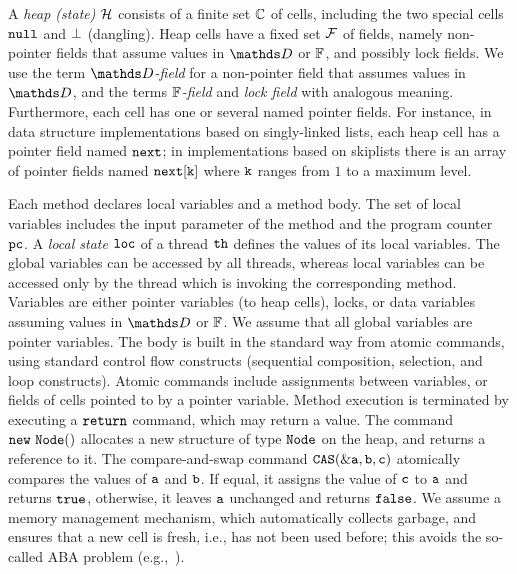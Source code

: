 A {\it heap (state)} ${\mathcal H}$ consists of a finite set
${\mathbb C}$ of cells, including the two special cells
${\tt null}$ and $\bot$ (dangling).
Heap cells have a fixed set $\mathcal{F}$ of fields, namely
non-pointer fields that assume values in
$\ddomain$ or $\mathbb{F}$, and possibly lock fields.
We use the term {\em $\ddomain$-field} for a non-pointer field that
assumes values in $\ddomain$, and the terms {\em $\mathbb{F}$-field} and {\em lock field}
with analogous meaning.
Furthermore, each cell has one or several named pointer fields.
For instance, in data structure implementations based on singly-linked lists,
each heap cell has a pointer field named $\tt next$; in implementations
based on skiplists there is an array of pointer fields named
$\tt next[k]$ where $\tt k$ ranges from $1$ to a maximum level.

%
Each method declares local variables and a method body.
%
The set of local variables includes the input parameter of the method and
the program counter $\tt pc$.
A {\it local state} ${\tt loc}$ of a thread ${\tt th}$
defines  the values of its local variables.
The global variables can be
accessed by all threads, whereas local variables can be accessed only
by the thread which is invoking the corresponding method.
Variables are either pointer variables (to heap cells), locks, or data variables assuming values in $\ddomain$ or $\mathbb{F}$.
We assume that all global variables are pointer variables.
%
%
%
The body is built in the standard way
from atomic commands, using standard control
flow constructs (sequential composition, selection, and loop constructs).
%
%
%
Atomic commands include assignments between variables, 
or fields of cells pointed to by a pointer variable.
%
Method execution is terminated by executing a $\tt return$ command,
which may return a value.
%
The command $\tt new\ Node()$ allocates a new structure of type
$\tt Node$ on the heap, and returns a reference to it.
%
The compare-and-swap command $\tt CAS(\&a,b,c)$ atomically
compares the values of $\tt a$ and $\tt b$.
If  equal, it assigns the value of
$\tt c$ to $\tt a$  and returns $\tt true$, 
otherwise, it leaves $\tt a$ unchanged and returns $\tt false$. 
We assume a memory management mechanism, which automatically collects
garbage, and ensures that a new cell is fresh, i.e., has
not been used before; this avoids the so-called
ABA problem (e.g.,~\cite{MS:QueueAlgorithms}).
%

